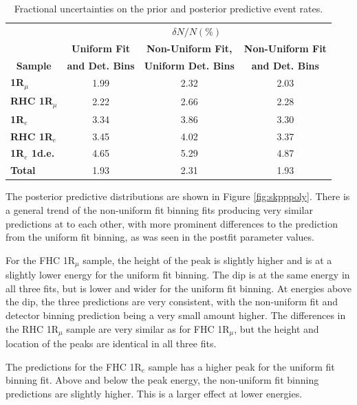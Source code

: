 \begin{center}
\begin{table}[!htbp]
\center
\begin{tabular}{l||c c c}
\hline \hline
& \multicolumn{3}{c}{$\delta N/N (\%)$}\\
& \multicolumn{1}{c}{\textbf{Uniform Fit}} & \multicolumn{1}{c}{\textbf{Non-Uniform Fit,}} & \multicolumn{1}{c}{\textbf{Non-Uniform Fit}}\\
\multicolumn{1}{c||}{\textbf{Sample}} & \multicolumn{1}{c}{\textbf{and Det. Bins}} & \multicolumn{1}{c}{\textbf{Uniform Det. Bins}} & \multicolumn{1}{c}{\textbf{and Det. Bins}}\\
\hline\hline
\textbf{1R$_{\mu}$} & 1.99 & 2.32 & 2.03\\
\textbf{RHC 1R$_{\mu}$} & 2.22 & 2.66 & 2.28 \\ 
\textbf{1R$_{e}$} & 3.34 & 3.86 & 3.30\\
\textbf{RHC 1R$_{e}$} & 3.45 & 4.02 & 3.37\\
\textbf{1R$_{e}$ 1d.e.} & 4.65 & 5.29 & 4.87\\ \hline
\textbf{Total} & 1.93 & 2.31 & 1.93\\ \hline\hline
\end{tabular}
\caption{Fractional uncertainties on the prior and posterior predictive \SK event rates.}
\label{tab:SKerrpoly}
\end{table}
\end{center}
\vspace{-1.0cm}

The posterior predictive distributions are shown in Figure \ref{fig:skpppoly}. There is a general trend of the non-uniform fit binning fits producing very similar predictions at \SK to each other, with more prominent differences to the prediction from the uniform fit binning, as was seen in the postfit parameter values.

For the FHC 1R$_{\mu}$ sample, the height of the peak is slightly higher and is at a slightly lower energy for the uniform fit binning. The dip is at the same energy in all three fits, but is lower and wider for the uniform fit binning. At energies above the dip, the three predictions are very consistent, with the non-uniform fit and detector binning prediction being a very small amount higher. The differences in the RHC 1R$_{\mu}$ sample are very similar as for FHC 1R$_{\mu}$, but the height and location of the peaks are identical in all three fits.

The predictions for the FHC 1R$_e$ sample has a higher peak for the uniform fit binning fit. Above and below the peak energy, the non-uniform fit binning predictions are slightly higher. This is a larger effect at lower energies.

